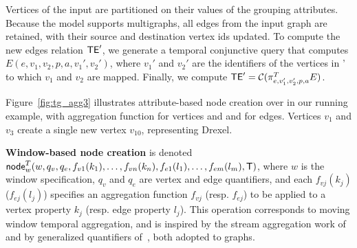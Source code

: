 Vertices of the input are partitioned on their values of the grouping
attributes.  Because the model supports multigraphs, all edges from
the input graph are retained, with their source and destination vertex
ids updated.  To compute the new edges relation $\textsf{TE}'$, we generate a
temporal conjunctive query that computes $E(e,v_1,v_2,p,a,v_1',v_2')$,
where $v_1'$ and $v_2'$ are the identifiers of the vertices in \tv' to
which $v_1$ and $v_2$ are mapped.  Finally, we compute $\textsf{TE}' =
\mathcal{C}(\pi^T_{e,v_1',v_2',p,a} E)$.

Figure~\ref{fig:tg_agg3} illustrates attribute-based node creation
over  in our running example, with 
aggregation function for vertices and and  for edges.
Vertices $v_1$ and $v_3$ create a single new vertex $v_{10}$,
representing Drexel.

{\bf Window-based node creation} is denoted\\
$\textsf{node}^T_w(w,q_v,q_e,f_{v1}(k_1),\ldots,f_{vn}(k_n),f_{e1}(l_1),\ldots,f_{em}(l_m),\mathsf{T})$,
where $w$ is the window specification, $q_v$ and $q_e$ are vertex and
edge quantifiers, and each $f_{vj}(k_j)$ ($f_{ej}(l_j)$) specifies an
aggregation function $f_{vj}$ (resp. $f_{ej}$) to be applied to a
vertex property $k_j$ (resp. edge property $l_j$).  This operation
corresponds to moving window temporal aggregation, and is inspired by
the stream aggregation work of~\cite{Li2005} and by generalized
quantifiers of~\cite{Hsu1995}, both adopted to graphs.



